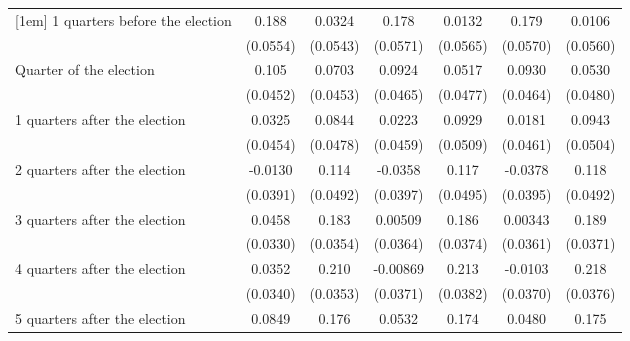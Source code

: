 \begin{table}[htbp]
\begin{tabular}{l*{6}{c}}
[1em]
 1 quarters before the election&       0.188\sym{***}&      0.0324         &       0.178\sym{**} &      0.0132         &       0.179\sym{**} &      0.0106         \\
                    &    (0.0554)         &    (0.0543)         &    (0.0571)         &    (0.0565)         &    (0.0570)         &    (0.0560)         \\
[1em]
Quarter of the election&       0.105\sym{*}  &      0.0703         &      0.0924\sym{*}  &      0.0517         &      0.0930\sym{*}  &      0.0530         \\
                    &    (0.0452)         &    (0.0453)         &    (0.0465)         &    (0.0477)         &    (0.0464)         &    (0.0480)         \\
[1em]
 1 quarters after the election&      0.0325         &      0.0844         &      0.0223         &      0.0929         &      0.0181         &      0.0943         \\
                    &    (0.0454)         &    (0.0478)         &    (0.0459)         &    (0.0509)         &    (0.0461)         &    (0.0504)         \\
[1em]
 2 quarters after the election&     -0.0130         &       0.114\sym{*}  &     -0.0358         &       0.117\sym{*}  &     -0.0378         &       0.118\sym{*}  \\
                    &    (0.0391)         &    (0.0492)         &    (0.0397)         &    (0.0495)         &    (0.0395)         &    (0.0492)         \\
[1em]
 3 quarters after the election&      0.0458         &       0.183\sym{***}&     0.00509         &       0.186\sym{***}&     0.00343         &       0.189\sym{***}\\
                    &    (0.0330)         &    (0.0354)         &    (0.0364)         &    (0.0374)         &    (0.0361)         &    (0.0371)         \\
[1em]
 4 quarters after the election&      0.0352         &       0.210\sym{***}&    -0.00869         &       0.213\sym{***}&     -0.0103         &       0.218\sym{***}\\
                    &    (0.0340)         &    (0.0353)         &    (0.0371)         &    (0.0382)         &    (0.0370)         &    (0.0376)         \\
[1em]
 5 quarters after the election&      0.0849\sym{*}  &       0.176\sym{***}&      0.0532         &       0.174\sym{***}&      0.0480         &       0.175\sym{***}\\

\end{tabular}
\end{table}
